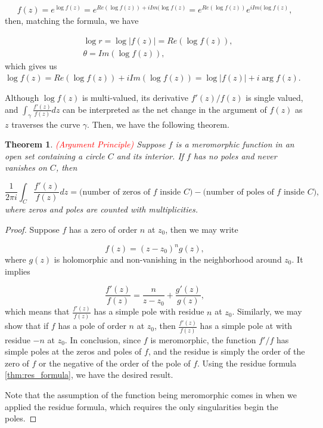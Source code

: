 \documentclass{article}
\newtheorem{theorem}{Theorem}
\begin{document}
\begin{equation*}
f(z)=e^{\log f(z)}=e^{Re(\log f(z))+i Im(\log f(z)}=e^{Re(\log f(z))}e^{i Im(\log f(z)},
\end{equation*}
then, matching the formula, we have

\begin{equation*}
\begin{aligned}
&\log r=\log |f(z)|=Re(\log f(z)),\\
&\theta=Im(\log f(z)),
\end{aligned}
\end{equation*}
which gives us $\log f(z)=Re(\log f(z))+i Im(\log f(z))=\log |f(z)|+i \arg f(z)$.

Although $\log f(z)$ is multi-valued, its derivative $f'(z)/f(z)$ is single valued, and $\int_\gamma \frac{f'(z)}{f(z)}dz$ can be interpreted as the net change in the argument of $f(z)$ as $z$ traverses the curve $\gamma$. Then, we have the following theorem. 

\begin{theorem} \textcolor{red}{(Argument Principle)}
Suppose $f$ is a meromorphic function in an open set containing a circle $C$ and its interior. If $f$ has no poles and never vanishes on $C$, then

\begin{equation} 
\frac{1}{2\pi i}\int_C \frac{f'(z)}{f(z)}dz=\text{(number of zeros of $f$ inside $C$)}-\text{(number of poles of $f$ inside $C$)},
\end{equation}
where zeros and poles are counted with multiplicities.
\end{theorem}

\begin{proof}
Suppose $f$ has a zero of order $n$ at $z_0$, then we may write

\begin{equation*}
f(z)=(z-z_0)^ng(z), 
\end{equation*}
where $g(z)$ is holomorphic and non-vanishing in the neighborhood around $z_0$. It implies

\begin{equation*}
\frac{f'(z)}{f(z)}=\frac{n}{z-z_0}+\frac{g'(z)}{g(z)},
\end{equation*}
which means that $\frac{f'(z)}{f(z)}$ has a simple pole with residue $n$ at $z_0$. Similarly, we may show that if $f$ has a pole of order $n$ at $z_0$, then $\frac{f'(z)}{f(z)}$ has a simple pole at with residue $-n$ at $z_0$. In conclusion, since $f$ is meromorphic, the function $f'/f$ has simple poles at the zeros and poles of $f$, and the residue is simply the order of the zero of $f$ or the negative of the order of the pole of $f$. Using the residue formula \ref{thm:res_formula}, we have the desired result. 

Note that the assumption of the function being meromorphic comes in when we applied the residue formula, which requires the only singularities begin the poles. 

\end{proof}
\end{document}
